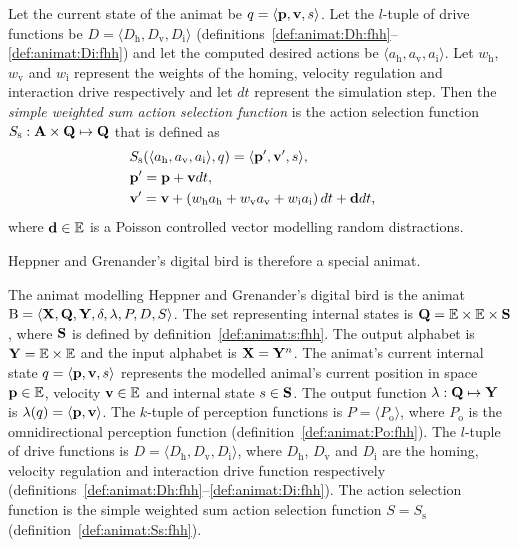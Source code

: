 \begin{defn}
\label{def:animat:Ss:fhh}
Let the current state of the animat be $q=\langle{\ensuremath{\mathbf{p}}},{\mathbf{v}},s\rangle$. Let the $l$-tuple of drive functions be $D=\langle D_\mathrm{h}, D_\mathrm{v}, D_\mathrm{i}\rangle$ (definitions~\ref{def:animat:Dh:fhh}--\ref{def:animat:Di:fhh}) and let the computed desired actions be $\langle a_\mathrm{h},a_\mathrm{v},a_\mathrm{i}\rangle$. Let $w_\mathrm{h}$, $w_\mathrm{v}$ and $w_\mathrm{i}$ represent the weights of the homing, velocity regulation and interaction drive respectively and let $dt$ represent the simulation step. Then the \emph{simple weighted sum action selection function} is the action selection function $S_\mathrm{s}: {\mathbf{A}} \times {\ensuremath{\mathbf{Q}}} \mapsto {\ensuremath{\mathbf{Q}}}$ that is defined as
\begin{eqnarray}
& S_\mathrm{s}(\langle a_\mathrm{h},a_\mathrm{v},a_\mathrm{i}\rangle, q) = \langle{\ensuremath{\mathbf{p}}}', {\mathbf{v}}', s\rangle, & \label{eq:animat:Ss0:fhh} \\
& {\mathbf{p}}' = {\mathbf{p}} + {\mathbf{v}}dt, & \\
& {\mathbf{v}}' = {\mathbf{v}} + \left(w_\mathrm{h}a_\mathrm{h} + w_\mathrm{v}a_\mathrm{v} + w_\mathrm{i}a_\mathrm{i}\right)dt + {\mathbf{d}}dt, & \label{eq:animat:Ss2:fhh} 
\end{eqnarray}
where ${\mathbf{d}} \in \mathbb{E}$ is a Poisson controlled vector modelling random distractions.
\end{defn}

Heppner and Grenander's digital bird \cite{heppner:1990} is therefore a special animat.

\begin{defn}
\label{def:animat:fhh}
The animat modelling Heppner and Grenander's digital bird is the animat ${\mathrm{B}}=\langle{\ensuremath{\mathbf{X}}},{\mathbf{Q}},{\mathbf{Y}},\delta,\lambda,P,D,S\rangle$. The set representing internal states is ${\mathbf{Q}}=\mathbb{E} \times \mathbb{E} \times {\ensuremath{\mathbf{S}}}$, where ${\mathbf{S}}$ is defined by definition~\ref{def:animat:s:fhh}. The output alphabet is ${\mathbf{Y}}=\mathbb{E} \times \mathbb{E}$ and the input alphabet is ${\mathbf{X}}={\mathbf{Y}}^n$. The animat's current internal state $q=\langle{\ensuremath{\mathbf{p}}},{\mathbf{v}},s\rangle$ represents the modelled animal's current position in space ${\mathbf{p}} \in \mathbb{E}$, velocity ${\mathbf{v}} \in \mathbb{E}$ and internal state $s \in {\ensuremath{\mathbf{S}}}$. The output function $\lambda: {\mathbf{Q}} \mapsto {\ensuremath{\mathbf{Y}}}$ is $\lambda(q)=\langle{\ensuremath{\mathbf{p}}},{\mathbf{v}}\rangle$. The $k$-tuple of perception functions is $P=\langle P_\mathrm{o}\rangle$, where $P_\mathrm{o}$ is the omnidirectional perception function (definition~\ref{def:animat:Po:fhh}). The $l$-tuple of drive functions is $D=\langle D_\mathrm{h},D_\mathrm{v},D_\mathrm{i}\rangle$, where $D_\mathrm{h}$, $D_\mathrm{v}$ and $D_\mathrm{i}$ are the homing, velocity regulation and interaction drive function respectively (definitions~\ref{def:animat:Dh:fhh}--\ref{def:animat:Di:fhh}). The action selection function is the simple weighted sum action selection function $S=S_\mathrm{s}$ (definition~\ref{def:animat:Ss:fhh}).
\end{defn}
